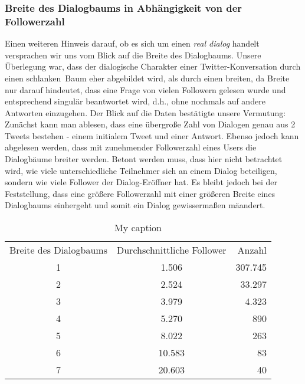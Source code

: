 \documentclass[main.tex]{subfiles}
\begin{document}
\subsubsection{Breite des Dialogbaums in Abhängigkeit von der  Followerzahl}

Einen weiteren Hinweis darauf, ob es sich um einen \textit{real dialog} handelt versprachen wir uns vom Blick auf die Breite des Dialogbaums. Unsere Überlegung war, dass der dialogische Charakter einer Twitter-Konversation durch einen \glqq schlanken\grqq\  Baum eher abgebildet wird, als durch einen \glqq breiten\grqq , da Breite nur darauf hindeutet, dass eine Frage von vielen Followern gelesen wurde und entsprechend singulär beantwortet wird, d.h., ohne nochmals auf andere Antworten einzugehen. Der Blick auf die Daten bestätigte unsere Vermutung: Zunächst kann man ablesen, dass eine übergroße Zahl von Dialogen genau aus 2 Tweets bestehen - einem initialem Tweet und einer Antwort. Ebenso jedoch kann abgelesen werden, dass mit zunehmender Followerzahl eines Users die Dialogbäume breiter werden. Betont werden muss, dass hier nicht betrachtet wird, wie viele unterschiedliche Teilnehmer sich an einem Dialog beteiligen, sondern wie viele Follower der Dialog-Eröffner hat. Es bleibt jedoch bei der Feststellung, dass eine größere Followerzahl mit einer größeren Breite eines Dialogbaums einhergeht und somit ein Dialog gewissermaßen mäandert.

\begin{table}[h]
\centering
\begin{tabular}{ccr}
Breite des Dialogbaums & Durchschnittliche Follower & Anzahl  \\
1                      & 1.506                       & 307.745 \\
2                      & 2.524                       & 33.297  \\
3                      & 3.979                       & 4.323   \\
4                      & 5.270                       & 890     \\
5                      & 8.022                       & 263     \\
6                      & 10.583                      & 83      \\
7                      & 20.603                      & 40     
\end{tabular}
\caption{My caption}
\label{my-label}
\end{table}
\end{document}
